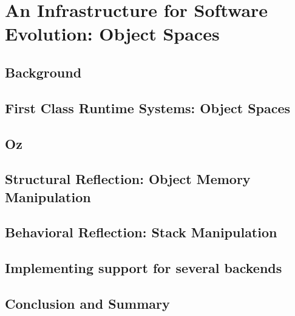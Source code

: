 
\chapter{An Infrastructure for Software Evolution: Object Spaces}
\minitoc
\introduction


\section{Background}

\section{First Class Runtime Systems: Object Spaces}

\section{Oz}

\section{Structural Reflection: Object Memory Manipulation}

\section{Behavioral Reflection: Stack Manipulation}

\section{Implementing support for several backends}

\section{Conclusion and Summary}

